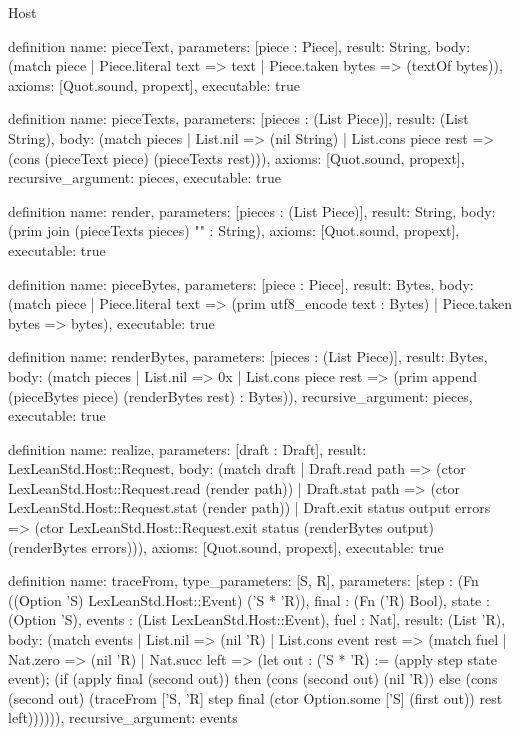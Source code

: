 \begin{lexlean}{Host}
\begin{semanticmodule}
definition{
  name: pieceText,
  parameters: [piece : Piece],
  result: String,
  body: (match piece
    | Piece.literal text => text
    | Piece.taken bytes => (textOf bytes)),
  axioms: [Quot.sound, propext],
  executable: true
}

definition{
  name: pieceTexts,
  parameters: [pieces : (List Piece)],
  result: (List String),
  body: (match pieces
    | List.nil => (nil String)
    | List.cons piece rest => (cons (pieceText piece) (pieceTexts rest))),
  axioms: [Quot.sound, propext],
  recursive_argument: pieces,
  executable: true
}

definition{
  name: render,
  parameters: [pieces : (List Piece)],
  result: String,
  body: (prim join (pieceTexts pieces) "" : String),
  axioms: [Quot.sound, propext],
  executable: true
}

definition{
  name: pieceBytes,
  parameters: [piece : Piece],
  result: Bytes,
  body: (match piece
    | Piece.literal text => (prim utf8_encode text : Bytes)
    | Piece.taken bytes => bytes),
  executable: true
}

definition{
  name: renderBytes,
  parameters: [pieces : (List Piece)],
  result: Bytes,
  body: (match pieces
    | List.nil => 0x
    | List.cons piece rest => (prim append (pieceBytes piece) (renderBytes rest) : Bytes)),
  recursive_argument: pieces,
  executable: true
}

definition{
  name: realize,
  parameters: [draft : Draft],
  result: LexLeanStd.Host::Request,
  body: (match draft
    | Draft.read path => (ctor LexLeanStd.Host::Request.read (render path))
    | Draft.stat path => (ctor LexLeanStd.Host::Request.stat (render path))
    | Draft.exit status output errors => (ctor LexLeanStd.Host::Request.exit status (renderBytes output) (renderBytes errors))),
  axioms: [Quot.sound, propext],
  executable: true
}

definition{
  name: traceFrom,
  type_parameters: [S, R],
  parameters: [step : (Fn ((Option 'S) LexLeanStd.Host::Event) ('S * 'R)), final : (Fn ('R) Bool), state : (Option 'S), events : (List LexLeanStd.Host::Event), fuel : Nat],
  result: (List 'R),
  body: (match events
    | List.nil => (nil 'R)
    | List.cons event rest => (match fuel
      | Nat.zero => (nil 'R)
      | Nat.succ left => (let out : ('S * 'R) := (apply step state event); (if (apply final (second out)) then (cons (second out) (nil 'R)) else (cons (second out) (traceFrom ['S, 'R] step final (ctor Option.some ['S] (first out)) rest left)))))),
  recursive_argument: events
}


\end{semanticmodule}
\end{lexlean}
